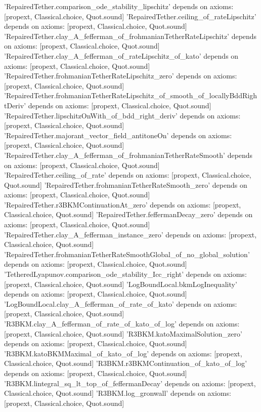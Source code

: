 \documentclass[11pt,a4paper]{article}
\theoremstyle{definition}
\theoremstyle{remark}
\begin{document}
\begin{leancode}
'RepairedTether.comparison_ode_stability_lipschitz' depends on axioms: [propext, Classical.choice, Quot.sound]
'RepairedTether.ceiling_of_rateLipschitz' depends on axioms: [propext, Classical.choice, Quot.sound]
'RepairedTether.clay_A_fefferman_of_frohmanianTetherRateLipschitz' depends on axioms: [propext, Classical.choice, Quot.sound]
'RepairedTether.clay_A_fefferman_of_rateLipschitz_of_kato' depends on axioms: [propext, Classical.choice, Quot.sound]
'RepairedTether.frohmanianTetherRateLipschitz_zero' depends on axioms: [propext, Classical.choice, Quot.sound]
'RepairedTether.frohmanianTetherRateLipschitz_of_smooth_of_locallyBddRightDeriv' depends on axioms: [propext, Classical.choice, Quot.sound]
'RepairedTether.lipschitzOnWith_of_bdd_right_deriv' depends on axioms: [propext, Classical.choice, Quot.sound]
'RepairedTether.majorant_vector_field_antitoneOn' depends on axioms: [propext, Classical.choice, Quot.sound]
'RepairedTether.clay_A_fefferman_of_frohmanianTetherRateSmooth' depends on axioms: [propext, Classical.choice, Quot.sound]
'RepairedTether.ceiling_of_rate' depends on axioms: [propext, Classical.choice, Quot.sound]
'RepairedTether.frohmanianTetherRateSmooth_zero' depends on axioms: [propext, Classical.choice, Quot.sound]
'RepairedTether.r3BKMContinuationAt_zero' depends on axioms: [propext, Classical.choice, Quot.sound]
'RepairedTether.feffermanDecay_zero' depends on axioms: [propext, Classical.choice, Quot.sound]
'RepairedTether.clay_A_fefferman_instance_zero' depends on axioms: [propext, Classical.choice, Quot.sound]
'RepairedTether.frohmanianTetherRateSmoothGlobal_of_no_global_solution' depends on axioms: [propext, Classical.choice, Quot.sound]
'TetheredLyapunov.comparison_ode_stability_Icc_right' depends on axioms: [propext, Classical.choice, Quot.sound]
'LogBoundLocal.bkmLogInequality' depends on axioms: [propext, Classical.choice, Quot.sound]
'LogBoundLocal.clay_A_fefferman_of_rate_of_kato' depends on axioms: [propext, Classical.choice, Quot.sound]
'R3BKM.clay_A_fefferman_of_rate_of_kato_of_log' depends on axioms: [propext, Classical.choice, Quot.sound]
'R3BKM.katoMaximalSolution_zero' depends on axioms: [propext, Classical.choice, Quot.sound]
'R3BKM.katoBKMMaximal_of_kato_of_log' depends on axioms: [propext, Classical.choice, Quot.sound]
'R3BKM.r3BKMContinuation_of_kato_of_log' depends on axioms: [propext, Classical.choice, Quot.sound]
'R3BKM.lintegral_sq_lt_top_of_feffermanDecay' depends on axioms: [propext, Classical.choice, Quot.sound]
'R3BKM.log_gronwall' depends on axioms: [propext, Classical.choice, Quot.sound]

\end{leancode}
\end{document}

